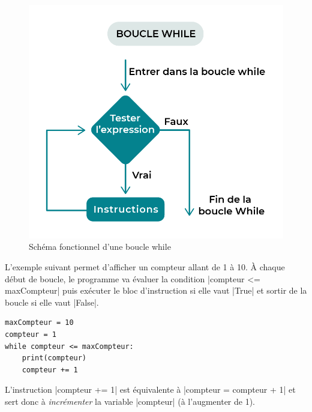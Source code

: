 \documentclass[11pt, a4paper]{book}
\begin{document}
\begin{figure}[h]\begin{center}
\includegraphics[scale=.3]{images/while-loop}
\caption{Schéma fonctionnel d'une boucle while}
\end{center}\end{figure}

\begin{example}
\label{ex:counter}
L'exemple suivant permet d'afficher un compteur allant de 1 à 10. À chaque début de boucle, le programme va évaluer la condition |compteur <= maxCompteur| puis exécuter le bloc d'instruction si elle vaut |True| et sortir de la boucle si elle vaut |False|.
\end{example}

\begin{lstlisting}
maxCompteur = 10
compteur = 1
while compteur <= maxCompteur:
    print(compteur)
    compteur += 1
\end{lstlisting}

\begin{remarque}
L'instruction |compteur += 1| est équivalente à |compteur = compteur + 1| et sert donc à \textit{incrémenter} la variable |compteur| (à l'augmenter de 1).
\end{remarque}
\end{document}
